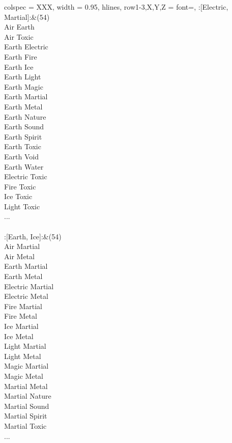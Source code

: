 \begin{longtblr}[
	caption = {2v2 Defending Weak},
	label = {2v2-Defending-Weak},
]{
	colspec = {XXX}, width = 0.95\linewidth,
	hlines,
	row{1-3,X,Y,Z} = {font=\bfseries},
}
	:[Electric, Martial]:&{(54)\\
	Air Earth \\
	Air Toxic \\
	Earth Electric \\
	Earth Fire \\
	Earth Ice \\
	Earth Light \\
	Earth Magic \\
	Earth Martial \\
	Earth Metal \\
	Earth Nature \\
	Earth Sound \\
	Earth Spirit \\
	Earth Toxic \\
	Earth Void \\
	Earth Water \\
	Electric Toxic \\
	Fire Toxic \\
	Ice Toxic \\
	Light Toxic \\
	...\\
	}\\

	:[Earth, Ice]:&{(54)\\
	Air Martial \\
	Air Metal \\
	Earth Martial \\
	Earth Metal \\
	Electric Martial \\
	Electric Metal \\
	Fire Martial \\
	Fire Metal \\
	Ice Martial \\
	Ice Metal \\
	Light Martial \\
	Light Metal \\
	Magic Martial \\
	Magic Metal \\
	Martial Metal \\
	Martial Nature \\
	Martial Sound \\
	Martial Spirit \\
	Martial Toxic \\
	...\\
	}\\


\end{longtblr}
